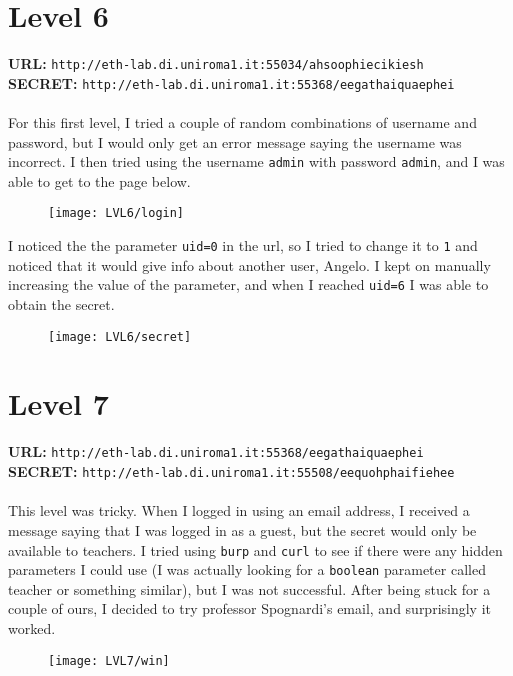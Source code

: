 \documentclass[12pt,a4paper]{article}
\begin{document}
	\section*{Level 6}
	\textbf{URL: }\texttt{http://eth-lab.di.uniroma1.it:55034/ahsoophiecikiesh }\\
	\textbf{SECRET: }\texttt{http://eth-lab.di.uniroma1.it:55368/eegathaiquaephei}\\\\
	For this first level, I tried a couple of random combinations of username and password, but I would only get an error message saying the username was incorrect. I then tried using the username \texttt{admin} with password \texttt{admin}, and I was able to get to the page below.
	\begin{figure}[H]
		\centering
		\texttt{[image: LVL6/login]}
		\label{fig:login6}
	\end{figure}
	I noticed the the parameter \texttt{uid=0} in the url, so I tried to change it to \texttt{1} and noticed that it would give info about another user, Angelo. I kept on manually increasing the value of the parameter, and when I reached \texttt{uid=6} I was able to obtain the secret.
	\begin{figure}[H]
		\centering
		\texttt{[image: LVL6/secret]}
		\label{fig:secret6}
	\end{figure}


	\section*{Level 7}
	\textbf{URL: }\texttt{http://eth-lab.di.uniroma1.it:55368/eegathaiquaephei}\\
	\textbf{SECRET: }\texttt{http://eth-lab.di.uniroma1.it:55508/eequohphaifiehee}\\\\
	This level was tricky. When I logged in using an email address, I received a message saying that I was logged in as a guest, but the secret would only be available to teachers. I tried using \texttt{burp} and \texttt{curl} to see if there were any hidden parameters I could use (I was actually looking for a \texttt{boolean} parameter called teacher or something similar), but I was not successful. After being stuck for a couple of ours, I decided to try professor Spognardi's email, and surprisingly it worked.
	\begin{figure}[H]
		\centering
		\texttt{[image: LVL7/win]}
		\label{fig:win7}
	\end{figure}
\end{document}
